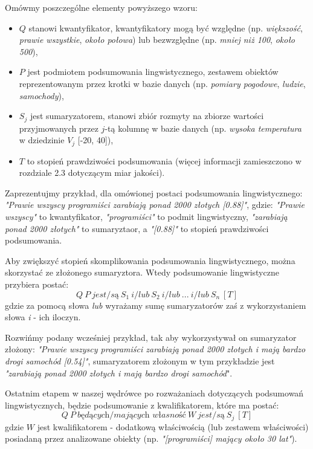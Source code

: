 \documentclass{classrep}
\begin{document}
Omówmy poszczególne elementy powyższego wzoru:
\begin{itemize}[label=$\bullet$\scshape\bfseries]
\item $Q$ stanowi kwantyfikator, kwantyfikatory mogą być względne (np. \textit{większość}, \textit{prawie wszystkie}, \textit{około połowa}) lub bezwzględne (np. \textit{mniej niż 100}, \textit{około 500}),
\item $P$ jest podmiotem podsumowania lingwistycznego, zestawem obiektów reprezentowanym przez krotki w bazie danych (np. \textit{pomiary pogodowe},  \textit{ludzie},  \textit{samochody}),
\item $S_j$ jest sumaryzatorem, stanowi zbiór rozmyty na zbiorze wartości przyjmowanych przez $j$-tą kolumnę w bazie danych (np. \textit{wysoka temperatura} w dziedzinie $V_j$ [-20, 40]),
\item $T$ to stopień prawdziwości podsumowania (więcej informacji zamieszczono w rozdziale 2.3 dotyczącym miar jakości).
\end{itemize}

Zaprezentujmy przykład, dla omówionej postaci podsumowania lingwistycznego: \textit{"Prawie wszyscy programiści zarabiają ponad 2000 złotych [0.88]"}, gdzie:  \textit{"Prawie wszyscy"} to kwantyfikator,  \textit{"programiści"} to podmit lingwistyczny, \textit{"zarabiają ponad 2000 złotych"} to sumaryztaor, a  \textit{"[0.88]"} to stopień prawdziwości podsumowania. \newline

Aby zwiększyć stopień skomplikowania podsumowania lingwistycznego, można skorzystać ze złożonego sumaryztora. Wtedy podsumowanie lingwistyczne przybiera postać:
\begin{equation}
Q  ~ P ~ { \textit{jest/są} }  ~ S_1 ~ \textit{i/lub} ~ S_2  ~ \textit{i/lub} ~ ... ~ \textit{i/lub} ~ S_n ~[T]
\end{equation}
gdzie za pomocą słowa \textit{lub} wyrażamy sumę sumaryzatorów zaś z wykorzystaniem słowa \textit{i} - ich iloczyn.\newline

Rozwińmy podany wcześniej przykład, tak aby wykorzystywał on sumaryzator złożony: \textit{"Prawie wszyscy programiści zarabiają ponad 2000 złotych i mają bardzo drogi samochód [0.54]"}, sumaryzatorem złożonym w tym przykładzie jest \textit{"zarabiają ponad 2000 złotych i mają bardzo drogi samochód}".\newline


Ostatnim etapem w naszej wędrówce po rozważaniach dotyczących podsumowań lingwistycznych, będzie podsumowanie z kwalifikatorem, które ma postać:
\begin{equation}
Q  ~ P ~ \textit{będących/mających własność} ~ W  ~ { \textit{jest/są} }  ~ S_j ~[T]
\end{equation}
gdzie $W$ jest kwalifikatorem - dodatkową właściwością (lub zestawem właściwości) posiadaną przez analizowane obiekty (np. \textit{"[programiści] mający około 30 lat"}).\newline
\end{document}

